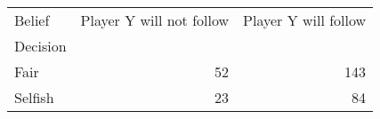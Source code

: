 \begin{tabular}{lrr}
\toprule
Belief &  Player Y will not follow &  Player Y will follow \\
Decision &                           &                       \\
\midrule
Fair     &                        52 &                   143 \\
Selfish  &                        23 &                    84 \\
\bottomrule
\end{tabular}
